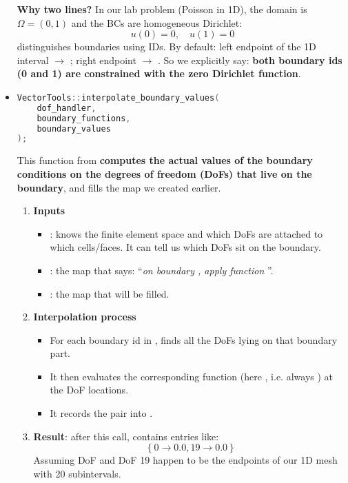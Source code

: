 \begin{itemize}
    \textcolor{Green3}{ \textbf{Why two lines?}} In our lab problem (Poisson in 1D), the domain is $\Omega = \left(0, 1\right)$ and the BCs are homogeneous Dirichlet:
    \begin{equation*}
        u(0)=0, \quad u(1)=0
    \end{equation*}
     distinguishes boundaries using IDs. By default: left endpoint of the 1D interval $\to$ ; right endpoint $\to$ . So we explicitly say: \textbf{both boundary ids (0 and 1) are constrained with the zero Dirichlet function}.


    \item {}
    \begin{lstlisting}[language=C++]
VectorTools::interpolate_boundary_values(
    dof_handler,
    boundary_functions,
    boundary_values
);\end{lstlisting}
    This function from  \textbf{computes the actual values of the boundary conditions on the degrees of freedom (DoFs) that live on the boundary}, and fills the  map we created earlier.
    \begin{enumerate}
        \item \textbf{Inputs}
        \begin{itemize}
            \item {}: knows the finite element space and which DoFs are attached to which cells/faces. It can tell us which DoFs sit on the boundary.
            \item {}: the map that says: ``\emph{on boundary , apply function }''.
            \item {}: the map that will be filled.
        \end{itemize}
        \item \textbf{Interpolation process}
        \begin{itemize}
            \item For each boundary id in ,  finds all the DoFs lying on that boundary part.
            \item It then evaluates the corresponding function (here , i.e. always ) at the DoF locations.
            \item It records the pair  into .
        \end{itemize}
        \item \textbf{Result}: after this call,  contains entries like:
        \begin{equation*}
            \left\{0 \to 0.0, 19 \to 0.0\right\}
        \end{equation*}
        Assuming DoF and DoF 19 happen to be the endpoints of our 1D mesh with 20 subintervals.
    \end{enumerate}


\end{itemize}
